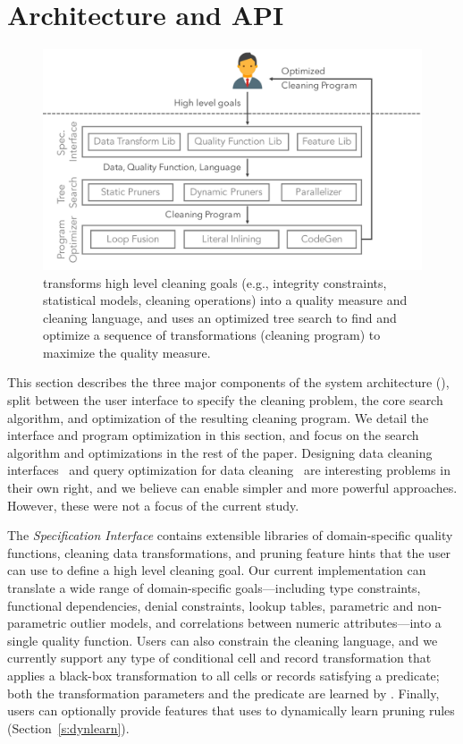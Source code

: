 \section{Architecture and API}
\begin{figure}[t]
\centering
 \includegraphics[width=.8\columnwidth]{figures/alphacleanarch.pdf}
 \caption{\small \sys transforms high level cleaning goals (e.g., integrity constraints, statistical models, cleaning operations) into a quality measure and cleaning language, and uses an optimized tree search to find and optimize a sequence of transformations (cleaning program) to maximize the quality measure.   \label{fig:arch} }
\end{figure}
This section describes the three major components of the \sys system architecture (), split between the user interface to specify the cleaning problem, the core search algorithm, and optimization of the resulting cleaning program.  We detail the interface and program optimization in this section, and focus on the search algorithm and optimizations in the rest of the paper. Designing data cleaning interfaces~\cite{DBLP:conf/uist/GuoKHH11} and query optimization for data cleaning~\cite{DBLP:conf/vldb/GalhardasFSSS01, khayyat2015bigdansing} are interesting problems in their own right, and we believe \sys can enable simpler and more powerful approaches.  However, these were not a focus of the current study.

The {\it Specification Interface} contains extensible libraries of domain-specific quality functions, cleaning data transformations, and pruning feature hints that the user can use to define a high level cleaning goal.  Our current implementation can translate a wide range of domain-specific goals---including type constraints, functional dependencies, denial constraints, lookup tables, parametric and non-parametric outlier models, and correlations between numeric attributes---into a single quality function.  Users can also constrain the cleaning language, and we currently support any type of conditional cell and record transformation that applies a black-box transformation to all cells or records satisfying a predicate; both the transformation parameters and the predicate are learned by \sys.  Finally, users can optionally provide features that \sys uses to dynamically learn pruning rules (Section~\ref{s:dynlearn}).

